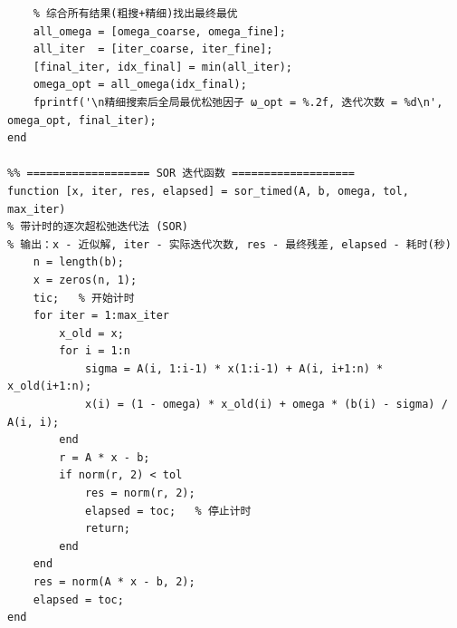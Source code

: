 \documentclass[12pt,a4paper]{ctexart}
\begin{document}
\begin{lstlisting}
    % 综合所有结果(粗搜+精细)找出最终最优
    all_omega = [omega_coarse, omega_fine];
    all_iter  = [iter_coarse, iter_fine];
    [final_iter, idx_final] = min(all_iter);
    omega_opt = all_omega(idx_final);
    fprintf('\n精细搜索后全局最优松弛因子 ω_opt = %.2f, 迭代次数 = %d\n', omega_opt, final_iter);
end

%% =================== SOR 迭代函数 ===================
function [x, iter, res, elapsed] = sor_timed(A, b, omega, tol, max_iter)
% 带计时的逐次超松弛迭代法 (SOR)
% 输出：x - 近似解, iter - 实际迭代次数, res - 最终残差, elapsed - 耗时(秒)
    n = length(b);
    x = zeros(n, 1);
    tic;   % 开始计时
    for iter = 1:max_iter
        x_old = x;
        for i = 1:n
            sigma = A(i, 1:i-1) * x(1:i-1) + A(i, i+1:n) * x_old(i+1:n);
            x(i) = (1 - omega) * x_old(i) + omega * (b(i) - sigma) / A(i, i);
        end
        r = A * x - b;
        if norm(r, 2) < tol
            res = norm(r, 2);
            elapsed = toc;   % 停止计时
            return;
        end
    end
    res = norm(A * x - b, 2);
    elapsed = toc;
end
\end{lstlisting}
\end{document}
